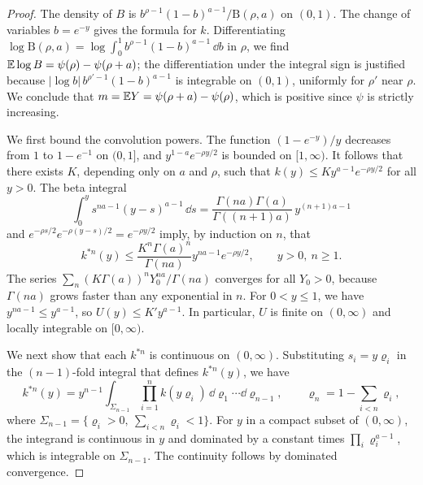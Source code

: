 \begin{proof}
The density of $B$ is $b^{\rho-1}(1-b)^{a-1}/\mathrm B(\rho,a)$ on $(0,1)$. The change of variables $b=e^{-y}$ gives the formula for $k$. Differentiating $\log\mathrm B(\rho,a)=\log\int_0^1b^{\rho-1}(1-b)^{a-1}\,\dd b$ in $\rho$, we find $\mathbb E\log B=\psi(\rho)-\psi(\rho+a)$; the differentiation under the integral sign is justified because $|\log b|\,b^{\rho'-1}(1-b)^{a-1}$ is integrable on $(0,1)$, uniformly for $\rho'$ near $\rho$. We conclude that $m=\mathbb E Y=\psi(\rho+a)-\psi(\rho)$, which is positive since $\psi$ is strictly increasing.

We first bound the convolution powers. The function $(1-e^{-y})/y$ decreases from $1$ to $1-e^{-1}$ on $(0,1]$, and $y^{1-a}e^{-\rho y/2}$ is bounded on $[1,\infty)$. It follows that there exists $K$, depending only on $a$ and $\rho$, such that $k(y)\le Ky^{a-1}e^{-\rho y/2}$ for all $y>0$. The beta integral
\[
 \int_0^ys^{na-1}(y-s)^{a-1}\,\dd s=\frac{\Gamma(na)\Gamma(a)}{\Gamma((n+1)a)}\,y^{(n+1)a-1}
\]
and $e^{-\rho s/2}e^{-\rho(y-s)/2}=e^{-\rho y/2}$ imply, by induction on $n$, that
\begin{equation}
 k^{*n}(y)\le
 \frac{K^n\Gamma(a)^n}{\Gamma(na)}y^{na-1}e^{-\rho y/2},\qquad y>0,\ n\ge1 .
 \label{eq:sc-beta-renewal-envelope}
\end{equation}
The series $\sum_n(K\Gamma(a))^nY_0^{na}/\Gamma(na)$ converges for all $Y_0>0$, because $\Gamma(na)$ grows faster than any exponential in $n$. For $0<y\le1$, we have $y^{na-1}\le y^{a-1}$, so $U(y)\le K'y^{a-1}$. In particular, $U$ is finite on $(0,\infty)$ and locally integrable on $[0,\infty)$.

We next show that each $k^{*n}$ is continuous on $(0,\infty)$. Substituting $s_i=y\varrho_i$ in the $(n-1)$-fold integral that defines $k^{*n}(y)$, we have
\[
 k^{*n}(y)=y^{n-1}\int_{\Sigma_{n-1}}\prod_{i=1}^nk(y\varrho_i)\,\dd\varrho_1\cdots\dd\varrho_{n-1},
 \qquad\varrho_n=1-\sum_{i<n}\varrho_i,
\]
where $\Sigma_{n-1}=\{\varrho_i>0,\ \sum_{i<n}\varrho_i<1\}$. For $y$ in a compact subset of $(0,\infty)$, the integrand is continuous in $y$ and dominated by a constant times $\prod_i\varrho_i^{a-1}$, which is integrable on $\Sigma_{n-1}$. The continuity follows by dominated convergence.


\end{proof}
